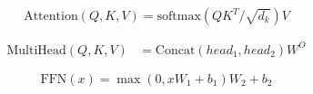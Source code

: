 \begin{equation}
\mathrm{Attention}(Q,K,V)=\mathrm{softmax}(QK^T/\sqrt{d_k})V
\label{eq:attention}
\end{equation}

\begin{align*}
\mathrm{MultiHead}(Q,K,V)&=\mathrm{Concat}(head_1,head_2)W^O
\end{align*}

\begin{equation}
\mathrm{FFN}(x)=\max(0,xW_1+b_1)W_2+b_2
\label{eq:ffn}
\end{equation}
